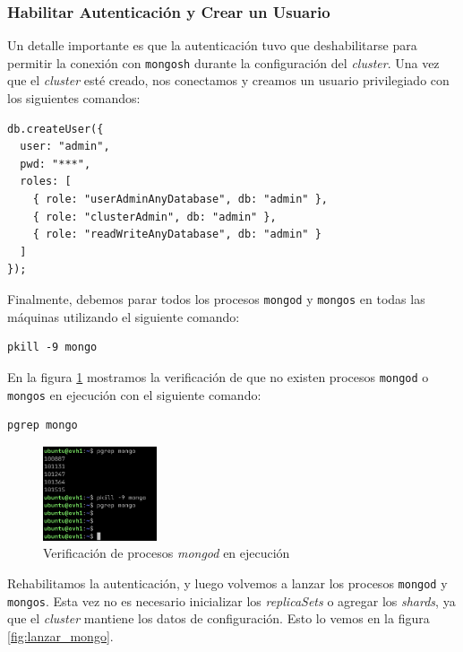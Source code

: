 \subsubsection*{Habilitar Autenticación y Crear un Usuario}

Un detalle importante es que la autenticación tuvo que deshabilitarse para permitir la conexión con \texttt{mongosh} durante la configuración del \textit{cluster}. Una vez que el \textit{cluster} esté creado, nos conectamos y creamos un usuario privilegiado con los siguientes comandos:

\begin{verbatim}
db.createUser({
  user: "admin",
  pwd: "***",
  roles: [
    { role: "userAdminAnyDatabase", db: "admin" },
    { role: "clusterAdmin", db: "admin" },
    { role: "readWriteAnyDatabase", db: "admin" }
  ]
});
\end{verbatim}

Finalmente, debemos parar todos los procesos \texttt{mongod} y \texttt{mongos} en todas las máquinas utilizando el siguiente comando:

\begin{verbatim}
pkill -9 mongo
\end{verbatim}

En la figura \ref{fig:matar_mongo} mostramos la verificación de que no existen procesos \texttt{mongod} o \texttt{mongos} en ejecución con el siguiente comando:

\begin{verbatim}
pgrep mongo
\end{verbatim}

\begin{figure}[H]
\centering
\includegraphics[width=0.3\textwidth]{fotos/mongo/matar_mongo.png}
\caption{Verificación de procesos \textit{mongod} en ejecución}
\label{fig:matar_mongo}
\end{figure}

Rehabilitamos la autenticación, y luego volvemos a lanzar los procesos \texttt{mongod} y \texttt{mongos}. Esta vez no es necesario inicializar los \textit{replicaSets} o agregar los \textit{shards}, ya que el \textit{cluster} mantiene los datos de configuración. Esto lo vemos en la figura \ref{fig:lanzar_mongo}.

